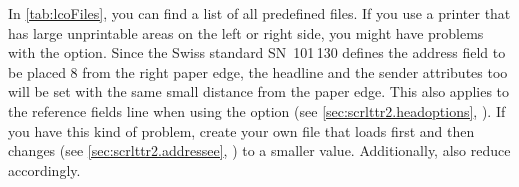 In \autoref{tab:lcoFiles},  you can find a
list of all predefined  files. If you use a printer that has
large unprintable areas on the left or right side, you might have
problems with the  option. Since the Swiss
standard SN~101\,130 defines the address field to be placed 8 from
the right paper edge, the headline and the sender attributes too will
be set with the same small distance from the paper edge. This also
applies to the reference fields line when using the
 option (see
\autoref{sec:scrlttr2.headoptions},
). If you have this kind of
problem, create your own  file that loads  first
and then changes  (see
\autoref{sec:scrlttr2.addressee},
) to a smaller
value. Additionally, also reduce  accordingly.
%
%

